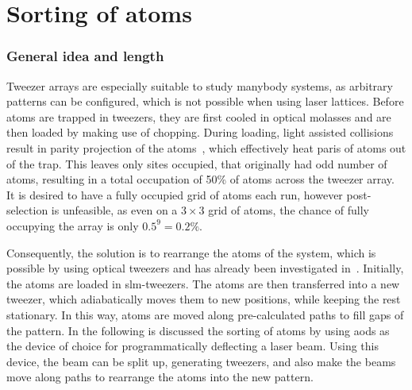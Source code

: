 \chapter{Sorting of atoms}%
\label{sec:sorting}

\subsection*{General idea and length}


Tweezer arrays are especially suitable to study manybody systems, as arbitrary patterns can be configured, which is not possible when using laser lattices. Before atoms are trapped in tweezers, they are first cooled in optical molasses and are then loaded by making use of chopping. During loading, light assisted collisions result in parity projection of the atoms~\cite{Cooper2018}, which effectively heat paris of atoms out of the trap. This leaves only sites occupied, that originally had odd number of atoms, resulting in a total occupation of 50\% of atoms across the tweezer array. It is desired to have a fully occupied grid of atoms each run, however post-selection is unfeasible, as even on a $3\times3$ grid of atoms, the chance of fully occupying the array is only $0.5^9 = 0.2\%$.

Consequently, the solution is to rearrange the atoms of the system, which is possible by using optical tweezers and has already been investigated in~\cite{Barredo2016, Endres2016, Barredo2018}. Initially, the atoms are loaded in \ac{slm}-tweezers. The atoms are then transferred into a new tweezer, which adiabatically moves them to new positions, while keeping the rest stationary. In this way, atoms are moved along pre-calculated paths to fill gaps of the pattern. In the following is discussed the sorting of atoms by using \acp{aod} as the device of choice for programmatically deflecting a laser beam. Using this device, the beam can be split up, generating tweezers, and also make the beams move along paths to rearrange the atoms into the new pattern.


